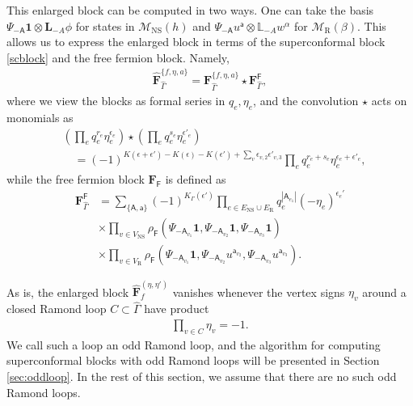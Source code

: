 \documentclass[aps,10pt,twocolumn,superscriptaddress]{revtex4-2}
\def\ie{\begin{equation}\begin{aligned}}
\def\fe{\end{aligned}\end{equation}}
\def\NS{\mathrm{NS}}
\def\R{\mathrm{R}}
\begin{document}
This enlarged block can be computed in two ways. One can take the basis $\Psi_{-\mathsf{A}}\mathbf{1}\otimes \mathbf{L}_{-A}\phi$ for states in $\mathcal{M}_\NS(h)$ and $\Psi_{-\mathsf{A}}u^{\mathsf{a}}\otimes \mathbb{L}_{-A}w^\alpha$ for $\mathcal{M}_{\R}(\beta)$. This allows us to express the enlarged block in terms of the superconformal block \eqref{scblock} and the free fermion block. Namely,
\ie \label{FconvF}
\widehat{\mathbf{F}}_{\hat{\Gamma}}^{\{f,\eta,a\}} = \mathbf{F}_{\hat{\Gamma}}^{\{f,\eta,a\}} \star \mathbf{F}^{\mathsf{F}}_{\hat{\Gamma}},
\fe
where we view the blocks as formal series in $q_e, \eta_e$, and the convolution $\star$ acts on monomials as
\ie \label{conv}
&\left(\prod_e q_e^{r_e}\eta_e^{\epsilon_e}\right)\star\left(\prod_e q_e^{s_e}\eta_e^{\epsilon'_e}\right)\\
&\quad = (-1)^{K(\epsilon+\epsilon')-K(\epsilon)-K(\epsilon')+\sum_v\epsilon_{v,2}\epsilon'_{v,3}}
 \prod_e q_e^{r_e+s_e}\eta_e^{\epsilon_e+\epsilon'_e},
\fe
while the free fermion block $\mathbf{F}_{\mathsf{F}}$ is defined as
\ie
\mathbf{F}^{\mathsf{F}}_{\hat{\Gamma}} &= \sum_{\{\mathsf{A,a}\}} (-1)^{K_\Gamma(\epsilon')} \prod_{e\in E_\NS\cup E_\R} q_e^{|\mathsf{A}_{e_1}|}(-\eta_e)^{\epsilon_e'}\\
&\times \prod_{v\in V_\NS} \rho_{\mathsf{F}}(\Psi_{-\mathsf{A}_{v_1}}\mathbf{1},\Psi_{-\mathsf{A}_{v_2}}\mathbf{1},\Psi_{-\mathsf{A}_{v_3}}\mathbf{1})\\
&\times \prod_{v\in V_\R} \rho_{\mathsf{F}}(\Psi_{-\mathsf{A}_{v_1}}\mathbf{1},\Psi_{-\mathsf{A}_{v_2}}u^{\mathsf{a}_{v_2}},\Psi_{-\mathsf{A}_{v_3}}u^{\mathsf{a}_{v_3}}).
\fe

As is, the enlarged block $\hat{\mathbf{F}}^{(\eta, \eta')}_f$ vanishes whenever the vertex signs $\eta_v$ around a closed Ramond loop $C\subset \hat{\Gamma}$ have product
\ie
\prod_{v\in C}\eta_v = -1.
\fe
We call such a loop an odd Ramond loop, and the algorithm for computing superconformal blocks with odd Ramond loops will be presented in Section \ref{sec:oddloop}. In the rest of this section, we assume that there are no such odd Ramond loops.
\end{document}
